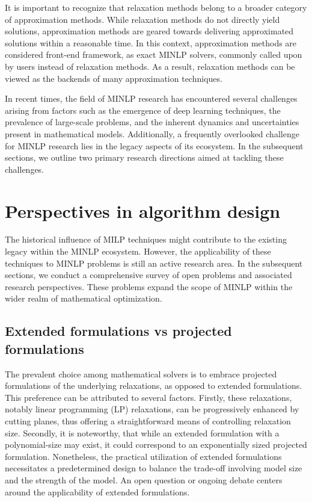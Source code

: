 It is important to recognize that relaxation methods belong to a broader category of approximation methods. While relaxation methods do not directly yield solutions, approximation methods are geared towards delivering approximated solutions within a reasonable time. In this context, approximation methods are considered front-end framework, as exact MINLP solvers, commonly called upon by users instead of relaxation methods. As a result, relaxation methods can be viewed as the backends of many approximation techniques.



In recent times, the field of MINLP research has encountered several challenges arising from factors such as the emergence of deep learning techniques, the prevalence of large-scale problems, and the inherent dynamics and uncertainties present in mathematical models. Additionally, a frequently overlooked challenge for MINLP research lies in the legacy aspects of its ecosystem. In the subsequent sections, we outline two primary research directions aimed at tackling these challenges.

\section{Perspectives in algorithm design}


The historical influence of MILP techniques might contribute to the existing legacy within the MINLP ecosystem. However, the applicability of these techniques to MINLP problems is still an active research area. In the subsequent sections, we conduct a comprehensive survey of open problems and associated research perspectives. These problems expand the scope of MINLP within the wider realm of mathematical optimization.


\subsection{Extended formulations vs projected formulations}
The prevalent choice among mathematical solvers is to embrace projected formulations of the underlying relaxations, as opposed to extended formulations. This preference can be attributed to several factors. Firstly, these relaxations, notably linear programming (LP) relaxations, can be progressively enhanced by cutting planes, thus offering a straightforward means of controlling relaxation size. Secondly, it is noteworthy, that while an extended formulation with a polynomial-size may exist, it could correspond to an exponentially sized projected formulation. Nonetheless, the practical utilization of extended formulations necessitates a predetermined design to balance the trade-off involving model size and the strength of the model. An open question or ongoing debate centers around the applicability of extended formulations.


